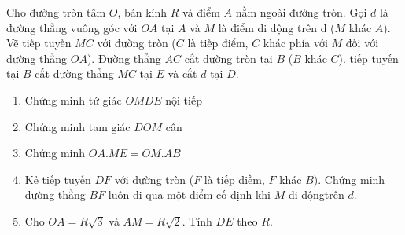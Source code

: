 \begin{ex}%
   Cho đường tròn tâm $O$, bán kính $R$ và điểm $A$ nằm ngoài đường tròn. Gọi $d$ là đường thẳng vuông góc với $OA$ tại $A$ và $M$ là điểm di dộng trên d ($M$ khác $A$). Vẽ tiếp tuyến $MC$ với đường tròn ($C$ là tiếp điểm, $C$ khác phía với $M$ đối với đường thẳng $OA$). Đường thẳng $AC$ cắt đường tròn tại $B$ ($B$ khác $C$). tiếp tuyến tại $B$ cắt đường thẳng $MC$ tại $E$ và cắt $d$ tại $D$.
   \begin{enumerate}
   	\item Chứng minh tứ giác $OMDE$ nội tiếp
   	\item Chứng minh tam giác $DOM$ cân
   	\item Chứng minh $OA.ME=OM.AB$
   	\item Kẻ tiếp tuyến $DF$ với đường tròn ($F$ là tiếp điềm, $F$ khác $B$). Chứng minh đường thẳng $BF$ luôn đi qua một điểm cố định khi $M$ di độngtrên $d$.
   	\item Cho $OA=R\sqrt{3}$ và $AM=R\sqrt{2}$. Tính $DE$ theo $R$.
   \end{enumerate}
\loigiai
    {\begin{center}
\end{center}}
\end{ex}
